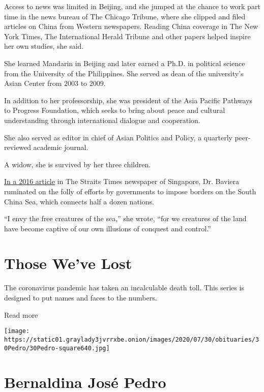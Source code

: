 Access to news was limited in Beijing, and she jumped at the chance to
work part time in the news bureau of The Chicago Tribune, where she
clipped and filed articles on China from Western newspapers. Reading
China coverage in The New York Times, The International Herald Tribune
and other papers helped inspire her own studies, she said.

She learned Mandarin in Beijing and later earned a Ph.D. in political
science from the University of the Philippines. She served as dean of
the university's Asian Center from 2003 to 2009.

In addition to her professorship, she was president of the Asia Pacific
Pathways to Progress Foundation, which seeks to bring about peace and
cultural understanding through international dialogue and cooperation.

She also served as editor in chief of Asian Politics and Policy, a
quarterly peer-reviewed academic journal.

A widow, she is survived by her three children.

\href{https://www.straitstimes.com/asia/can-anyone-really-rule-the-south-china-sea}{In
a 2016 article} in The Straits Times newspaper of Singapore, Dr. Baviera
ruminated on the folly of efforts by governments to impose borders on
the South China Sea, which connects half a dozen nations.

``I envy the free creatures of the sea,'' she wrote, ``for we creatures
of the land have become captive of our own illusions of conquest and
control.''

\href{https://www.nytimes3xbfgragh.onion/interactive/2020/obituaries/people-died-coronavirus-obituaries.html?action=click\&pgtype=Article\&state=default\&region=BELOW_MAIN_CONTENT\&context=covid_obits_promo}{}

\hypertarget{those-weve-lost}{%
\section{Those We've Lost}\label{those-weve-lost}}

The coronavirus pandemic has taken an incalculable death toll. This
series is designed to put names and faces to the numbers.

Read more

\texttt{[image: https://static01.graylady3jvrrxbe.onion/images/2020/07/30/obituaries/30Pedro/30Pedro-square640.jpg]}

\hypertarget{bernaldina-josuxe9-pedro}{%
\section{Bernaldina José Pedro}\label{bernaldina-josuxe9-pedro}}

